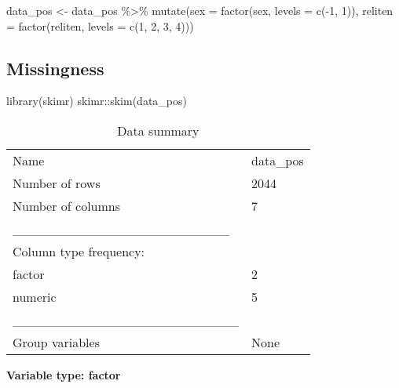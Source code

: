 \documentclass[
  letterpaper,
  DIV=11,
  numbers=noendperiod]{scrartcl}
\newenvironment{Shaded}{\begin{snugshade}}{\end{snugshade}}
\newcommand{\AttributeTok}[1]{\textcolor[rgb]{0.40,0.45,0.13}{#1}}
\newcommand{\DecValTok}[1]{\textcolor[rgb]{0.68,0.00,0.00}{#1}}
\newcommand{\FunctionTok}[1]{\textcolor[rgb]{0.28,0.35,0.67}{#1}}
\newcommand{\NormalTok}[1]{\textcolor[rgb]{0.00,0.23,0.31}{#1}}
\newcommand{\OtherTok}[1]{\textcolor[rgb]{0.00,0.23,0.31}{#1}}
\newcommand{\SpecialCharTok}[1]{\textcolor[rgb]{0.37,0.37,0.37}{#1}}
\begin{document}
\begin{Shaded}
\begin{Highlighting}[]
\NormalTok{data\_pos }\OtherTok{\textless{}{-}}\NormalTok{ data\_pos }\SpecialCharTok{\%\textgreater{}\%}
  \FunctionTok{mutate}\NormalTok{(}\AttributeTok{sex =} \FunctionTok{factor}\NormalTok{(sex, }\AttributeTok{levels =} \FunctionTok{c}\NormalTok{(}\SpecialCharTok{{-}}\DecValTok{1}\NormalTok{, }\DecValTok{1}\NormalTok{)),}
         \AttributeTok{reliten =} \FunctionTok{factor}\NormalTok{(reliten, }\AttributeTok{levels =} \FunctionTok{c}\NormalTok{(}\DecValTok{1}\NormalTok{, }\DecValTok{2}\NormalTok{, }\DecValTok{3}\NormalTok{, }\DecValTok{4}\NormalTok{)))}
\end{Highlighting}
\end{Shaded}

\subsection{Missingness}\label{missingness}

\begin{Shaded}
\begin{Highlighting}[]
\FunctionTok{library}\NormalTok{(skimr)}
\NormalTok{skimr}\SpecialCharTok{::}\FunctionTok{skim}\NormalTok{(data\_pos)}
\end{Highlighting}
\end{Shaded}

\begin{longtable}[]{@{}ll@{}}
\caption{Data summary}\tabularnewline
\toprule\noalign{}
\endfirsthead
\endhead
\bottomrule\noalign{}
\endlastfoot
Name & data\_pos \\
Number of rows & 2044 \\
Number of columns & 7 \\
\_\_\_\_\_\_\_\_\_\_\_\_\_\_\_\_\_\_\_\_\_\_\_ & \\
Column type frequency: & \\
factor & 2 \\
numeric & 5 \\
\_\_\_\_\_\_\_\_\_\_\_\_\_\_\_\_\_\_\_\_\_\_\_\_ & \\
Group variables & None \\
\end{longtable}

\textbf{Variable type: factor}
\end{document}
